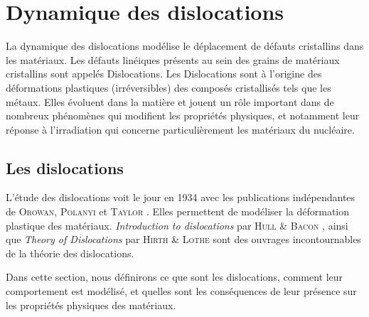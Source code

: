 \documentclass[11pt,class=article,float=false,crop=false]{standalone}
\begin{document}
	

\section{Dynamique des dislocations}

La dynamique des dislocations modélise le déplacement de défauts cristallins dans les matériaux. Les défauts linéiques présents au sein des grains de matériaux cristallins sont appelés Dislocations. Les Dislocations sont à l'origine des déformations plastiques (irréversibles) des composés cristallisés tels que les métaux. Elles évoluent dans la matière et jouent un rôle important dans de nombreux phénomènes qui modifient les propriétés physiques, et notamment leur réponse à l'irradiation qui concerne particulièrement les matériaux du nucléaire.


\subsection{Les dislocations}
\label{sec:dislocations}

L'étude des dislocations voit le jour en 1934 avec les publications indépendantes de \textsc{Orowan}, \textsc{Polanyi} et \textsc{Taylor} . Elles permettent de modéliser la déformation plastique des matériaux. \textit{Introduction to dislocations} par \textsc{Hull} \& \textsc{Bacon}  , ainsi que \textit{Theory of Dislocations} par \textsc{Hirth} \& \textsc{Lothe}  sont des ouvrages incontournables de la théorie des dislocations.

Dans cette section, nous définirons ce que sont les dislocations, comment leur comportement est modélisé, et quelles sont les conséquences de leur présence sur les propriétés physiques des matériaux.

\end{document}
